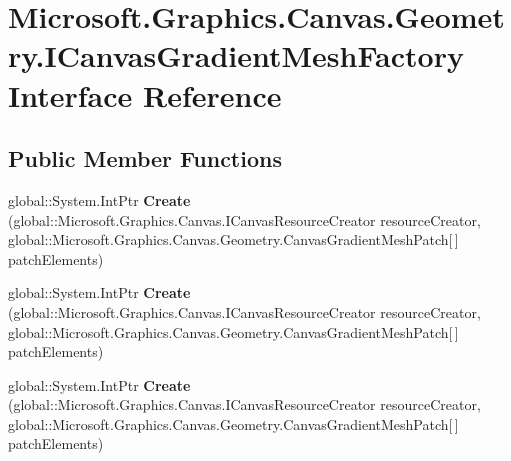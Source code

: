 \hypertarget{interface_microsoft_1_1_graphics_1_1_canvas_1_1_geometry_1_1_i_canvas_gradient_mesh_factory}{}\section{Microsoft.\+Graphics.\+Canvas.\+Geometry.\+I\+Canvas\+Gradient\+Mesh\+Factory Interface Reference}
\label{interface_microsoft_1_1_graphics_1_1_canvas_1_1_geometry_1_1_i_canvas_gradient_mesh_factory}
\subsection*{Public Member Functions}
\begin{DoxyCompactItemize}
\item 
\mbox{\label{interface_microsoft_1_1_graphics_1_1_canvas_1_1_geometry_1_1_i_canvas_gradient_mesh_factory_a89f013422e719c6aa2c18bcbf8c3df20}} 
global\+::\+System.\+Int\+Ptr {\bfseries Create} (global\+::\+Microsoft.\+Graphics.\+Canvas.\+I\+Canvas\+Resource\+Creator resource\+Creator, global\+::\+Microsoft.\+Graphics.\+Canvas.\+Geometry.\+Canvas\+Gradient\+Mesh\+Patch\mbox{[}$\,$\mbox{]} patch\+Elements)
\item 
\mbox{\label{interface_microsoft_1_1_graphics_1_1_canvas_1_1_geometry_1_1_i_canvas_gradient_mesh_factory_a89f013422e719c6aa2c18bcbf8c3df20}} 
global\+::\+System.\+Int\+Ptr {\bfseries Create} (global\+::\+Microsoft.\+Graphics.\+Canvas.\+I\+Canvas\+Resource\+Creator resource\+Creator, global\+::\+Microsoft.\+Graphics.\+Canvas.\+Geometry.\+Canvas\+Gradient\+Mesh\+Patch\mbox{[}$\,$\mbox{]} patch\+Elements)
\item 
\mbox{\label{interface_microsoft_1_1_graphics_1_1_canvas_1_1_geometry_1_1_i_canvas_gradient_mesh_factory_a89f013422e719c6aa2c18bcbf8c3df20}} 
global\+::\+System.\+Int\+Ptr {\bfseries Create} (global\+::\+Microsoft.\+Graphics.\+Canvas.\+I\+Canvas\+Resource\+Creator resource\+Creator, global\+::\+Microsoft.\+Graphics.\+Canvas.\+Geometry.\+Canvas\+Gradient\+Mesh\+Patch\mbox{[}$\,$\mbox{]} patch\+Elements)

\end{DoxyCompactItemize}
